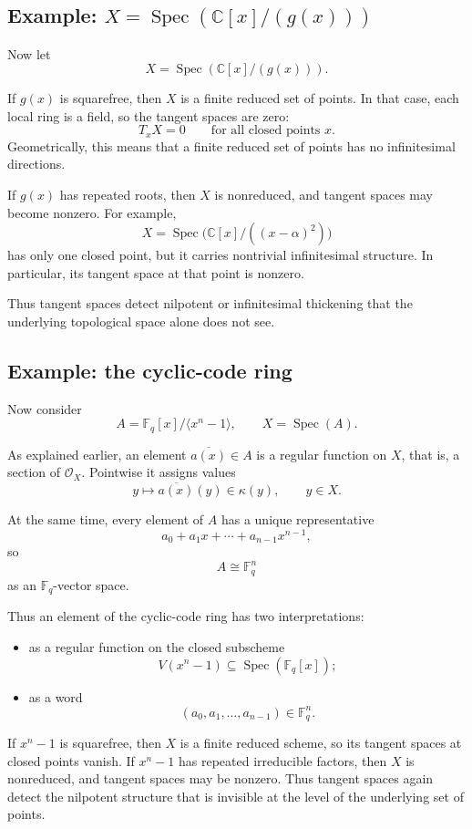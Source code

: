 \documentclass[11pt]{article}
\theoremstyle{definition}
\newcommand{\C}{\mathbb{C}}
\newcommand{\F}{\mathbb{F}}
\newcommand{\Spec}{\operatorname{Spec}}
\newcommand{\kk}[1]{\kappa\!\left(#1\right)}
\newcommand{\ideal}[1]{\langle #1\rangle}
\newcommand{\ol}[1]{\overline{#1}}
\begin{document}
\subsection{Example: \texorpdfstring{$X=\Spec(\C[x]/(g(x)))$}{X=Spec(C[x]/(g(x)))}}

Now let
\[
X=\Spec(\C[x]/(g(x))).
\]

If \(g(x)\) is squarefree, then \(X\) is a finite reduced set of points. In that case, each local ring is a field, so the tangent spaces are zero:
\[
T_xX=0
\qquad
\text{for all closed points }x.
\]
Geometrically, this means that a finite reduced set of points has no infinitesimal directions.

If \(g(x)\) has repeated roots, then \(X\) is nonreduced, and tangent spaces may become nonzero. For example,
\[
X=\Spec\!\bigl(\C[x]/((x-\alpha)^2)\bigr)
\]
has only one closed point, but it carries nontrivial infinitesimal structure. In particular, its tangent space at that point is nonzero.

Thus tangent spaces detect nilpotent or infinitesimal thickening that the underlying topological space alone does not see.

\subsection{Example: the cyclic-code ring}

Now consider
\[
A=\F_q[x]/\ideal{x^n-1},
\qquad
X=\Spec(A).
\]

As explained earlier, an element \(\ol{a(x)}\in A\) is a regular function on \(X\), that is, a section of \(\mathcal O_X\). Pointwise it assigns values
\[
y\longmapsto \ol{a(x)}(y)\in \kk{y},
\qquad y\in X.
\]

At the same time, every element of \(A\) has a unique representative
\[
a_0+a_1x+\cdots+a_{n-1}x^{n-1},
\]
so
\[
A\cong \F_q^n
\]
as an \(\F_q\)-vector space.

Thus an element of the cyclic-code ring has two interpretations:

\begin{itemize}
	\item as a regular function on the closed subscheme
	\[
	V(x^n-1)\subseteq \Spec(\F_q[x]);
	\]
	\item as a word
	\[
	(a_0,a_1,\dots,a_{n-1})\in \F_q^n.
	\]
\end{itemize}

If \(x^n-1\) is squarefree, then \(X\) is a finite reduced scheme, so its tangent spaces at closed points vanish. If \(x^n-1\) has repeated irreducible factors, then \(X\) is nonreduced, and tangent spaces may be nonzero. Thus tangent spaces again detect the nilpotent structure that is invisible at the level of the underlying set of points.
\end{document}
